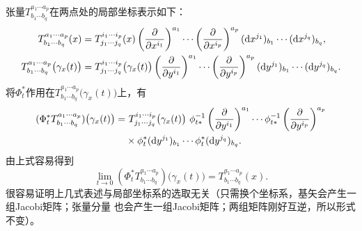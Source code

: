 张量$T^{a_1 \cdots a_p}_{b_1\cdots b_q} $在两点处的局部坐标表示如下：
\begin{align*}
    T^{a_1 \cdots a_p}_{b_1\cdots b_q}(x) & = T^{i_1 \cdots i_p}_{j_1\cdots j_q} (x)
    \left(\frac{\partial }{\partial x^{i_1}}\right)^{a_1} \cdots 
    \left(\frac{\partial }{\partial x^{i_p}}\right)^{a_p} 
    ({\rm d}x^{j_1})_{b_1} \cdots  ({\rm d}x^{j_q})_{b_q}    ,\\
    T^{a_1 \cdots a_p}_{b_1\cdots b_q}\bigl(\gamma_x(t)\bigr) 
    & = T^{i_1 \cdots i_p}_{j_1\cdots j_q}\bigl(\gamma_x(t)\bigr)
    \left(\frac{\partial }{\partial y^{i_1}}\right)^{a_1} \cdots 
    \left(\frac{\partial }{\partial y^{i_p}}\right)^{a_p} 
    ({\rm d}y^{j_1})_{b_1} \cdots  ({\rm d}y^{j_q})_{b_q}    .
\end{align*}
将$\Phi_t^*$作用在$T^{a_1 \cdots a_p}_{b_1\cdots b_q}\bigl(\gamma_x(t)\bigr)$上，有
\begin{equation}\label{chdm:eqn_tmp501}
\begin{aligned}
    (\Phi_t^* T^{a_1 \cdots a_p}_{b_1\cdots b_q})\bigl(\gamma_x(t)\bigr) 
     =& \ T^{i_1 \cdots i_p}_{j_1\cdots j_q}\bigl(\gamma_x(t)\bigr) \ 
    \phi_{t*} ^{-1}  \left(\frac{\partial }{\partial y^{i_1}}\right)^{a_1} \cdots 
    \phi_{t*} ^{-1} \left(\frac{\partial }{\partial y^{i_p}}\right)^{a_p} \\
    & \times \phi_{t}^{*}({\rm d}y^{j_1})_{b_1} \cdots \phi_{t}^{*} ({\rm d}y^{j_q})_{b_q}  .
\end{aligned}
\end{equation}
由上式容易得到
\begin{equation}
    \lim_{t\to 0}(\Phi_t^* T^{a_1 \cdots a_p}_{b_1\cdots b_q})\bigl(\gamma_x(t)\bigr)
    =T^{a_1 \cdots a_p}_{b_1\cdots b_q}(x).
\end{equation}
很容易证明上几式表述与局部坐标系的选取无关（只需换个坐标系，基矢会产生一组Jacobi矩阵；张量分量
也会产生一组Jacobi矩阵；两组矩阵刚好互逆，所以形式不变）。

